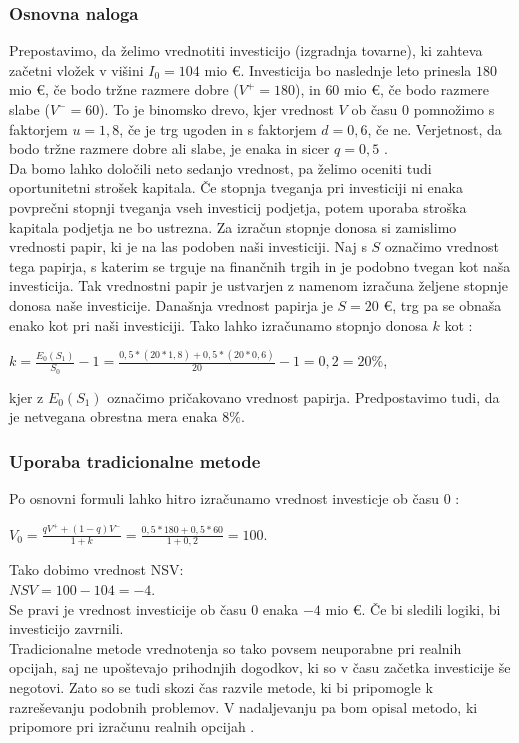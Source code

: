 \documentclass[12pt, a4paper]{amsart}
\theoremstyle{definition} %
\theoremstyle{plain} %
\begin{document}
\subsubsection{Osnovna naloga}
Prepostavimo, da želimo vrednotiti investicijo (izgradnja tovarne), ki zahteva začetni vložek v višini $I_0= 104$ mio €. Investicija bo naslednje leto prinesla $180$ mio €, če bodo tržne razmere dobre ($V^+=180$), in $60$ mio €, če bodo razmere slabe ($V^-=60$). To je binomsko drevo, kjer vrednost $V$ ob času 0 pomnožimo s faktorjem $u=1,8$, če je trg ugoden in s faktorjem $d=0,6$, če ne. Verjetnost, da bodo tržne razmere dobre ali slabe, je enaka in sicer $q=0,5$ \cite[str. 153]{Trigeorgis}. \\
Da bomo lahko določili neto sedanjo vrednost, pa želimo oceniti tudi oportunitetni strošek kapitala. Če stopnja tveganja pri investiciji ni enaka povprečni stopnji tveganja vseh investicij podjetja, potem uporaba stroška kapitala podjetja ne bo ustrezna. Za izračun stopnje donosa si zamislimo vrednosti papir, ki je na las podoben naši investiciji. Naj s $S$ označimo vrednost tega papirja, s katerim se trguje na finančnih trgih in je podobno tvegan kot naša investicija. Tak vrednostni papir je ustvarjen z namenom izračuna željene stopnje donosa naše investicije. Današnja vrednost papirja je $S=20$ €, trg pa se obnaša enako kot pri naši investiciji. Tako lahko izračunamo stopnjo donosa $k$ kot \cite[str. 153, 154]{Trigeorgis}:
\begin{center}
$k = \tfrac{E_0(S_1)}{S_0}-1= \tfrac{0,5 * (20*1,8)+0,5*(20*0,6)}{20}-1= 0,2 = 20 \%$,
\end{center}
kjer z $E_0(S_1)$ označimo pričakovano vrednost papirja. Predpostavimo tudi, da je netvegana obrestna mera enaka $8 \%$.\\

\subsubsection{Uporaba tradicionalne metode}
Po osnovni formuli lahko hitro izračunamo vrednost investicje ob času 0 \cite[str. 154]{Trigeorgis}:
\begin{center}
$V_0 = \tfrac{qV^+  + (1-q)V^-}{1+k}= \tfrac{0,5 * 180+0,5*60}{1+0,2}= 100$.
\end{center}
Tako dobimo vrednost NSV:\\
$NSV = 100 - 104 = -4$.\\
Se pravi je vrednost investicije ob času 0 enaka $-4$ mio €. Če bi sledili logiki, bi investicijo zavrnili.\\
Tradicionalne metode vrednotenja so tako povsem neuporabne pri realnih opcijah, saj ne upoštevajo prihodnjih dogodkov, ki so v času začetka investicije še negotovi. Zato so se tudi skozi čas razvile metode, ki bi pripomogle k razreševanju podobnih problemov. V nadaljevanju pa bom opisal metodo, ki pripomore pri izračunu realnih opcijah \cite[str. 154]{Trigeorgis}.\\
\end{document}
